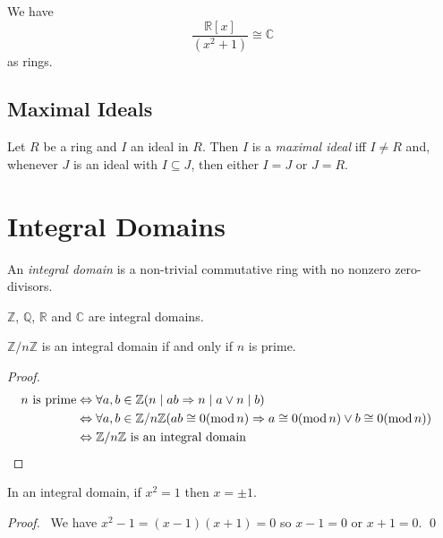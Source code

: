 \begin{ex}
We have
\[ \frac{\mathbb{R}[x]}{(x^2 + 1)} \cong \mathbb{C} \]
as rings.
\end{ex}

\section{Maximal Ideals}

\begin{df}
Let $R$ be a ring and $I$ an ideal in $R$. Then $I$ is a \emph{maximal ideal} iff $I \neq R$ and, whenever $J$ is an ideal with $I \subseteq J$, then either $I = J$ or $J = R$.
\end{df}

\chapter{Integral Domains}

\begin{df}
An \emph{integral domain} is a non-trivial commutative ring with no nonzero zero-divisors.
\end{df}

\begin{ex}
$\mathbb{Z}$, $\mathbb{Q}$, $\mathbb{R}$ and $\mathbb{C}$ are integral domains.
\end{ex}

\begin{prop}
$\mathbb{Z} / n \mathbb{Z}$ is an integral domain if and only if $n$ is prime.
\end{prop}

\begin{proof}
\pf
\begin{align*}
n \text{ is prime} & \Leftrightarrow \forall a,b \in \mathbb{Z} (n \mid a b \Rightarrow n \mid a \vee n \mid b) \\
& \Leftrightarrow \forall a,b \in \mathbb{Z} / n \mathbb{Z} (ab \cong 0 (\mod n) \Rightarrow a \cong 0 (\mod n) \vee b \cong 0 (\mod n)) \\
& \Leftrightarrow \mathbb{Z} / n \mathbb{Z} \text{ is an integral domain} & \qed
\end{align*}
\end{proof}

\begin{prop}
In an integral domain, if $x^2 = 1$ then $x = \pm 1$.
\end{prop}

\begin{proof}
\pf\ We have $x^2 - 1 = (x-1)(x+1) = 0$ so $x-1 = 0$ or $x+1 = 0$. \qed
\end{proof}

